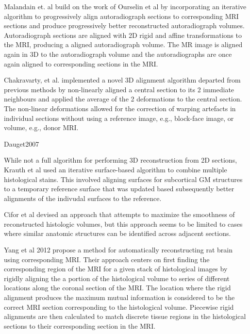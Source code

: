 \documentclass[12pt]{article}
\begin{document}
Malandain et. al \cite{Malndain2004} build on the work of Ourselin et al \cite{Ourselin2001} by incorporating an iterative algorithm to progressively align autoradiograph sections to corresponding MRI sections and produce progressively better reconstructed autoradiograph volumes. Autoradiograph sections are aligned with 2D rigid and affine transformations to the MRI, producing a aligned autoradiograph volume. The MR image is aligned again in 3D to the autoradiograph volume and the autoradiographs are once again aligned to corresponding sections in the MRI.

Chakravarty, et al. \cite{Chakravarty2003,Chakravarty2005} implemented a novel 3D alignment algorithm departed from previous methods by non-linearly aligned a central section to its 2 immediate neighbours and applied the average of the 2 deformations to the central section. The non-linear deformations allowed for the correction of warping artefacts in individual sections without using a reference image, e.g., block-face image, or volume, e.g., donor MRI. 

Dauget2007


While not a full algorithm for performing 3D reconstruction from 2D sections, Krauth et al \cite{krauth2010} used an iterative surface-based algorithm to combine multiple histological stains. This involved aligning surfaces for subcortical GM structures to a temporary reference surface that was updated based subsequently better alignments of the indivudal surfaces to the reference. 


Cifor et al \cite{Cifor2011} devised an approach that attempts to maximize the smoothness of reconstructed histologic volumes, but this approach seems to be limited to cases where similar anatomic structures can be identified across adjacent sections.  


Yang et al 2012 \cite{Yang2012} propose a method for automatically reconstructing rat brain using corresponding MRI. Their approach centers on first finding the corresponding region of the MRI for a given stack of histological images by rigidly aligning the a portion of the histological volume to series of different locations along the coronal section of the MRI. The location where the rigid alignment produces the maximum mutual information is considered to be the correct MRI section corresponding to the histological volume. Piecewise rigid alignments are then calculated to match discrete tissue regions in the histological sections to their corresponding section in the MRI. 
\end{document}
